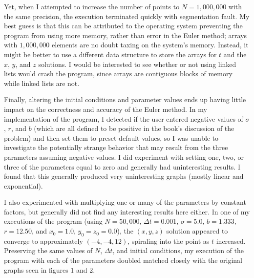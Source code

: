 \documentclass[12pt]{amsart}
\begin{document}
Yet, when I attempted to increase the number of points to $N = 1,000,000$ with the same precision, the execution terminated quickly with 
segmentation fault. My best guess is that this can be attributed to the operating system preventing the program from using more memory, rather
than error in the Euler method; arrays with $1,000,000$ elements are no doubt taxing on the system's memory. Instead, it might be better to use
a different data structure to store the arrays for $t$ and the $x$, $y$, and $z$ solutions. I would be interested to see whether or not using linked
lists would crash the program, since arrays are contiguous blocks of memory while linked lists are not.

Finally, altering the initial conditions and parameter values ends up having little impact on the correctness and accuracy of the Euler method. In
my implementation of the program, I detected if the user entered negative values of $\sigma$, $r$, and $b$ (which are all defined to be positive
in the book's discussion of the problem) and then set them to preset default values, so I was unable to investigate the potentially strange
behavior that may result from the three parameters assuming negative values. I did experiment with setting one, two, or three of the parameters
equal to zero and generally had uninteresting results. I found that this generally produced very uninteresting graphs (mostly linear and
exponential).

I also experimented with multiplying one or many of the parameters by constant factors, but generally did not find any interesting results here
either. In one of my executions of the program (using $N = 50,000$, $\Delta t = 0.001$, $\sigma = 5.0$, $b = 1.333$, $r = 12.50$, and 
$x_0 = 1.0$, $y_0 = z_0 = 0.0$), the $(x, y, z)$ solution appeared to converge to approximately $(-4, -4, 12)$, spiraling into the point as $t$ 
increased. Preserving the same values of $N$, $\Delta t$, and initial conditions, my execution of the program with each of the parameters
doubled matched closely with the original graphs seen in figures 1 and 2.
\end{document}
